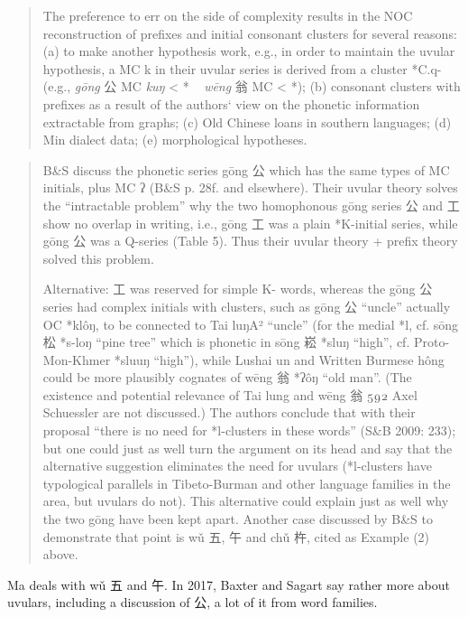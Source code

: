 \begin{quote}
The preference to err on the side of complexity results in the NOC reconstruction
of prefixes and initial consonant clusters for several reasons: (a) to make another
hypothesis work, e.g., in order to maintain the uvular hypothesis, a MC k in their
uvular series is derived from a cluster *C.q- (e.g., \textit{gōng} 公 MC \textit{kuŋ} < *{} ~ \textit{wēng}
翁 MC \textit{} < *{}); (b) consonant clusters with prefixes as a result of the authors`
view on the phonetic information extractable from graphs; (c) Old Chinese loans
in southern languages; (d) Min dialect data; (e) morphological hypotheses. {\citep[782]{Schuessler2015BSrv}}
\end{quote}

\begin{quote}
B\&S discuss the phonetic series gōng 公 which has the same types of MC initials,
plus MC ʔ (B\&S p. 28f. and elsewhere). Their uvular theory solves the ``intractable
problem'' why the two homophonous gōng series 公 and 工 show no overlap
in writing, i.e., gōng 工 was a plain *K-initial series, while gōng 公 was a Q-series
(Table 5). Thus their uvular theory + prefix theory solved this problem.

Alternative: 工 was reserved for simple K- words, whereas the gōng 公 series had
complex initials with clusters, such as gōng 公 ``uncle'' actually OC *klôŋ, to be connected
to Tai luŋA² ``uncle'' (for the medial *l, cf. sōng 松 *s-loŋ ``pine tree'' which
is phonetic in sōng 崧 *sluŋ ``high'', cf. Proto-Mon-Khmer *sluuŋ ``high''), while
Lushai un and Written Burmese hông could be more plausibly cognates of wēng
翁 *ʔôŋ ``old man''. (The existence and potential relevance of Tai lung and wēng 翁
 Axel Schuessler
are not discussed.) The authors conclude that with their proposal ``there is no need
for *l-clusters in these words'' (S\&B 2009: 233); but one could just as well turn the
argument on its head and say that the alternative suggestion eliminates the need
for uvulars (*l-clusters have typological parallels in Tibeto-Burman and other language
families in the area, but uvulars do not). This alternative could explain just
as well why the two gōng have been kept apart. Another case discussed by B\&S to
demonstrate that point is wǔ 五, 午 and chǔ 杵, cited as Example (2) above.
\end{quote}

Ma deals with wǔ 五 and 午. 
In 2017, Baxter and Sagart say rather more about uvulars, including a discussion of  公, a lot of it from word families. 




